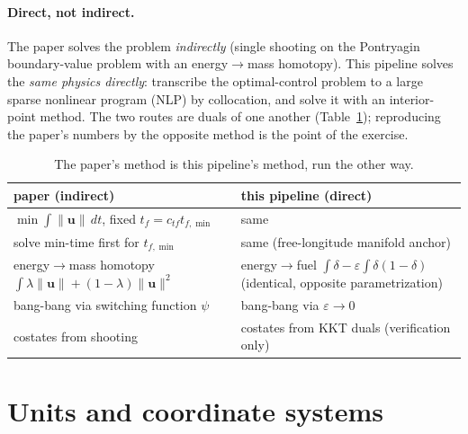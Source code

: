 \documentclass[11pt]{article}
\newcommand{\uv}{\mathbf{u}}
\begin{document}
\paragraph{Direct, not indirect.} The paper solves the problem \emph{indirectly}
(single shooting on the Pontryagin boundary-value problem with an
energy$\to$mass homotopy). This pipeline solves the \emph{same physics
directly}: transcribe the optimal-control problem to a large sparse nonlinear
program (NLP) by collocation, and solve it with an interior-point method. The two
routes are duals of one another (Table~\ref{tab:duality}); reproducing the
paper's numbers by the opposite method is the point of the exercise.

\begin{table}[h]\centering\small
\begin{tabular}{@{}ll@{}}
\toprule
paper (indirect) & this pipeline (direct) \\
\midrule
$\min\int\lVert\uv\rVert\,dt$, fixed $t_f=c_{tf}t_{f,\min}$ & same \\
solve min-time first for $t_{f,\min}$ & same (free-longitude manifold anchor) \\
energy$\to$mass homotopy $\int\lambda\lVert\uv\rVert+(1-\lambda)\lVert\uv\rVert^2$ & energy$\to$fuel $\int\delta-\varepsilon\!\int\delta(1-\delta)$ (identical, opposite parametrization)\\
bang-bang via switching function $\psi$ & bang-bang via $\varepsilon\to0$ \\
costates from shooting & costates from KKT duals (verification only) \\
\bottomrule
\end{tabular}
\caption{The paper's method is this pipeline's method, run the other way.}
\label{tab:duality}
\end{table}

\section{Units and coordinate systems}
\end{document}

